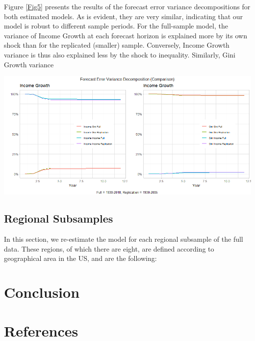 \documentclass[11pt,preprint, authoryear]{elsarticle}
\let\origfigure\figure
\let\endorigfigure\endfigure
\renewenvironment{figure}[1][2] {
    \expandafter\origfigure\expandafter[H]
} {
    \endorigfigure
}
\numberwithin{equation}{section}
\numberwithin{figure}{section}
\numberwithin{table}{section}
\begin{document}
Figure \ref{Fig5} presents the results of the forecast error variance
decompositions for both estimated models. As is evident, they are very
similar, indicating that our model is robust to different sample
periods. For the full-sample model, the variance of Income Growth at
each forecast horizon is explained more by its own shock than for the
replicated (smaller) sample. Conversely, Income Growth variance is thus
also explained less by the shock to inequality. Similarly, Gini Growth
variance

\begin{figure}[H]
\includegraphics[width=1\linewidth]{images/Fig5_fevd_all} \caption{\label{Fig5}}\label{fig:Fig5}
\end{figure}

\newpage

\hypertarget{regional-subsamples}{%
\subsection{\texorpdfstring{Regional Subsamples
\label{Section 3.4}}{Regional Subsamples }}\label{regional-subsamples}}

In this section, we re-estimate the model for each regional subsample of
the full data. These regions, of which there are eight, are defined
according to geographical area in the US, and are the following:

\hypertarget{conclusion}{%
\section{Conclusion}\label{conclusion}}

\newpage

\hypertarget{references}{%
\section*{References}\label{references}}
\end{document}
